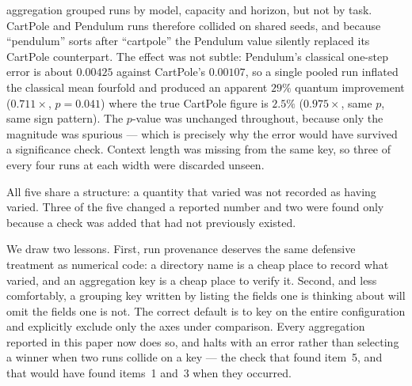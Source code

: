 \documentclass[11pt,onecolumn]{article}
\begin{document}
\begin{enumerate}
      aggregation grouped runs by model, capacity and horizon, but not
      by task. CartPole and Pendulum runs therefore collided on shared
      seeds, and because ``pendulum'' sorts after ``cartpole'' the
      Pendulum value silently replaced its CartPole counterpart. The
      effect was not subtle: Pendulum's classical one-step error is
      about $0.00425$ against CartPole's $0.00107$, so a single pooled
      run inflated the classical mean fourfold and produced an apparent
      $29\%$ quantum improvement ($0.711\times$, $p = 0.041$) where the
      true CartPole figure is $2.5\%$ ($0.975\times$, same $p$, same
      sign pattern). The $p$-value was unchanged throughout, because
      only the magnitude was spurious --- which is precisely why the
      error would have survived a significance check. Context length
      was missing from the same key, so three of every four runs at each
      width were discarded unseen.

\end{enumerate}

All five share a structure: a quantity that varied was not
recorded as having varied. Three of the five changed a reported
number and two were found only because a check was added that had not
previously existed.

We draw two lessons. First, run provenance deserves the same defensive
treatment as numerical code: a directory name is a cheap place to
record what varied, and an aggregation key is a cheap place to verify
it. Second, and less comfortably, a grouping key written by listing the
fields one is thinking about will omit the fields one is not. The
correct default is to key on the entire configuration and explicitly
exclude only the axes under comparison. Every aggregation reported in
this paper now does so, and halts with an error rather than selecting a
winner when two runs collide on a key --- the check that found item~5,
and that would have found items~1 and~3 when they occurred.
\end{document}
